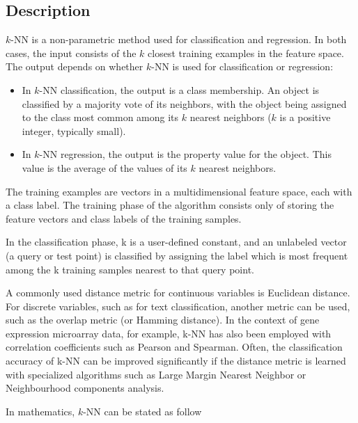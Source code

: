 \subsection{Description}
$k$-NN is a non-parametric method used for classification and regression. In both cases, the input consists of the $k$ closest training examples in the feature space. The output depends on whether $k$-NN is used for classification or regression:
\begin{itemize}
\item In $k$-NN classification, the output is a class membership. An object is classified by a majority vote of its neighbors, with the object being assigned to the class most common among its $k$ nearest neighbors ($k$ is a positive integer, typically small).
\item In $k$-NN regression, the output is the property value for the object. This value is the average of the values of its $k$ nearest neighbors.
\end{itemize}
The training examples are vectors in a multidimensional feature space, each with a class label. The training phase of the algorithm consists only of storing the feature vectors and class labels of the training samples.

In the classification phase, k is a user-defined constant, and an unlabeled vector (a query or test point) is classified by assigning the label which is most frequent among the k training samples nearest to that query point.

A commonly used distance metric for continuous variables is Euclidean distance. For discrete variables, such as for text classification, another metric can be used, such as the overlap metric (or Hamming distance). In the context of gene expression microarray data, for example, k-NN has also been employed with correlation coefficients such as Pearson and Spearman. Often, the classification accuracy of k-NN can be improved significantly if the distance metric is learned with specialized algorithms such as Large Margin Nearest Neighbor or Neighbourhood components analysis.

In mathematics, $k$-NN can be stated as follow

